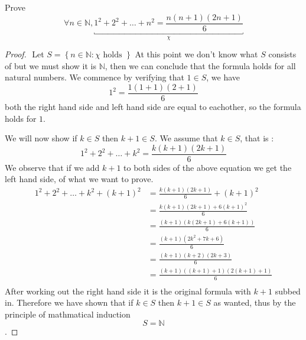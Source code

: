 \documentclass[11pt]{book}
\begin{document}
\begin{eg}
    Prove 
    \[
        \forall n \in \mathbb{N} , \underbracket{1^2  + 2^2  + \ldots  + n^2 = \frac{n\left( n + 1 \right) \left( 2n + 1 \right) }{6}}_{\chi} 
    \]
    \begin{proof}
    $ $\newline
        Let $S= \left\{ n \in \mathbb{N} : \chi \text{ holds }  \right\} $ At this point we don't know what $S$ consists of but we must show it is $\mathbb{N} $, then we can conclude that the formula holds for all natural numbers. We commence by verifying that $1\in S$, we have 
        \[
            1^2 = \frac{1\left( 1 + 1 \right) \left( 2 + 1 \right) }{6}
        \]
        both the right hand side and left hand side are equal to eachother, so the formula holds for $1$. 

        We will now show if $k \in S$ then $k + 1 \in S$. We assume that $k \in S$, that is :
        \[
            1^2  + 2^2  + \ldots  + k^2 = \frac{k\left( k + 1 \right) \left( 2k + 1 \right) }{6}
        \]
        We observe that if we add $k + 1$ to both sides of the above equation we get the left hand side, of what we want to prove.
        \begin{align*}
            1^2  + 2^2  + \ldots  + k^2  + \left( k + 1 \right) ^2 &= \frac{k\left( k + 1 \right) \left( 2k + 1 \right) }{6} + \left( k + 1 \right) ^2 \\
            &= \frac{k\left( k + 1 \right) \left( 2k + 1 \right)  + 6\left( k + 1 \right) ^2 }{6}  \\ 
            &= \frac{\left( k + 1 \right) \left( k\left( 2k + 1 \right)  + 6\left( k + 1 \right)  \right) }{6}  \\ 
            &= \frac{\left( k + 1 \right) \left( 2k^2  + 7k + 6 \right) }{6}  \\ 
            &= \frac{\left( k + 1 \right) \left( k + 2 \right) \left( 2k + 3 \right) }{6} \\ 
            &= \frac{\left( k + 1 \right) \left( \left( k + 1 \right)  + 1  \right) \left( 2\left( k + 1 \right)  + 1 \right) }{6}  \\ 
        \end{align*}
        After working out the right hand side it is the original formula with $k + 1$ subbed in. Therefore we have shown that  if $k \in S$ then $k + 1 \in S$ as wanted, thus by the principle of mathmatical induction 
        \[
        S= \mathbb{N} 
        \]
        .
    \end{proof}
\end{eg}
\end{document}
